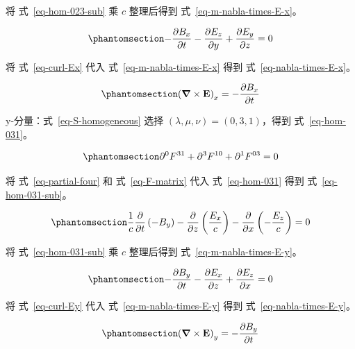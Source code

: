 \documentclass[
  chinese,
  a4paper,
  UTF8,
  12pt,
  oneside,
  openany]{ctexbook}
\theoremstyle{plain}
\theoremstyle{plain}
\theoremstyle{plain}
\theoremstyle{definition}
\theoremstyle{plain}
\theoremstyle{plain}
\theoremstyle{remark}
\begin{document}
将 式~\ref{eq-hom-023-sub} 乘 \(c\) 整理后得到
式~\ref{eq-m-nabla-times-E-x}。

\begin{equation}\protect\phantomsection\label{eq-m-nabla-times-E-x}{
- \frac{\partial B_x}{\partial t} - \frac{\partial E_z}{\partial y} + \frac{\partial E_y}{\partial z} = 0
}\end{equation}

将 式~\ref{eq-curl-Ex} 代入 式~\ref{eq-m-nabla-times-E-x} 得到
式~\ref{eq-nabla-times-E-x}。

\begin{equation}\protect\phantomsection\label{eq-nabla-times-E-x}{
\left(\boldsymbol{\nabla} \times \mathbf{E} \right)_{x} = -\frac{\partial B_x}{\partial t}
}\end{equation}

y-分量：式~\ref{eq-S-homogeneous} 选择
\((\lambda,\mu,\nu) = (0,3,1)\)，得到 式~\ref{eq-hom-031}。

\begin{equation}\protect\phantomsection\label{eq-hom-031}{
\partial^{0}F^{31} + \partial^{3}F^{10} + \partial^{1}F^{03} = 0
}\end{equation}

将 式~\ref{eq-partial-four} 和 式~\ref{eq-F-matrix} 代入
式~\ref{eq-hom-031} 得到 式~\ref{eq-hom-031-sub}。

\begin{equation}\protect\phantomsection\label{eq-hom-031-sub}{
\frac{1}{c}\frac{\partial}{\partial t}\left(- B_y \right) - \frac{\partial}{\partial z}\left(\frac{E_x}{c} \right) - \frac{\partial}{\partial x}\left(- \frac{E_z}{c} \right) = 0
}\end{equation}

将 式~\ref{eq-hom-031-sub} 乘 \(c\) 整理后得到
式~\ref{eq-m-nabla-times-E-y}。

\begin{equation}\protect\phantomsection\label{eq-m-nabla-times-E-y}{
- \frac{\partial B_y}{\partial t} - \frac{\partial E_x}{\partial z} + \frac{\partial E_z}{\partial x} = 0
}\end{equation}

将 式~\ref{eq-curl-Ey} 代入 式~\ref{eq-m-nabla-times-E-y} 得到
式~\ref{eq-nabla-times-E-y}。

\begin{equation}\protect\phantomsection\label{eq-nabla-times-E-y}{
\left(\boldsymbol{\nabla} \times \mathbf{E} \right)_{y} = -\frac{\partial B_y}{\partial t}
}\end{equation}
\end{document}

